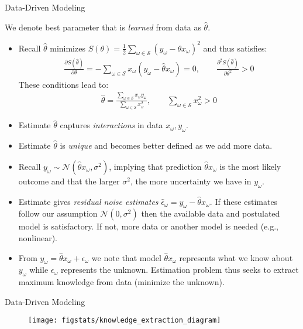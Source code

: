 \documentclass[handout,9pt]{beamer}
\begin{document}
%
\begin{frame}{Data-Driven Modeling}

We denote best parameter that is {\em learned} from data as $\hat{\theta}$. 
\begin{itemize}
\setlength{\itemsep}{5pt}
\item Recall $\hat{\theta}$ minimizes $S(\theta)=\frac{1}{2}\sum_{\omega \in \mathcal{S}} (y_\omega-\theta x_\omega)^2$ and thus satisfies:
\begin{align*}
\frac{\partial S(\hat{\theta})}{\partial \theta}=-\sum_{\omega \in \mathcal{S}}x_\omega (y_\omega-\hat{\theta} x_\omega)=0,\qquad  \frac{\partial^2 S(\hat{\theta})}{\partial \theta^2}>0
\end{align*}
These conditions lead to:
\begin{align*}
\hat{\theta}=\frac{\sum_{\omega \in \mathcal{S}}x_\omega y_\omega}{\sum_{\omega \in \mathcal{S}}x_\omega^2},\qquad \sum_{\omega \in \mathcal{S}}x_\omega^2>0 
\end{align*}
\item Estimate $\hat{\theta}$ captures {\em interactions} in data $x_\omega,y_\omega$. 
\item Estimate $\hat{\theta}$ is {\em unique} and becomes better defined as we add more data. 
\item Recall $y_\omega \sim \mathcal{N}(\hat{\theta} x_\omega,\sigma^2)$, implying that prediction $\hat{\theta} x_\omega$ is the most likely outcome and that the larger $\sigma^2$, the more uncertainty we have in $y_\omega$. 
\item Estimate gives {\em residual noise estimates} $\hat{\epsilon}_\omega =y_\omega-\hat{\theta}x_\omega$. If these estimates follow our assumption $\mathcal{N}(0,\sigma^2)$ then the available data and postulated model is satisfactory. If not, more data or another model is needed (e.g., nonlinear). 

\item From $y_\omega=\hat{\theta}x_\omega+\epsilon_\omega$ we note that model $\hat{\theta}x_\omega$ represents what we know about $y_\omega$ while $\epsilon_\omega$ represents the unknown. Estimation problem thus seeks to extract maximum knowledge from data (minimize the unknown). 
\end{itemize}
\end{frame}

%
\begin{frame}{Data-Driven Modeling}

\begin{figure}[!htb]
    \centering
	\texttt{[image: figstats/knowledge\_extraction\_diagram]}
\end{figure}

\end{frame}
\end{document}
